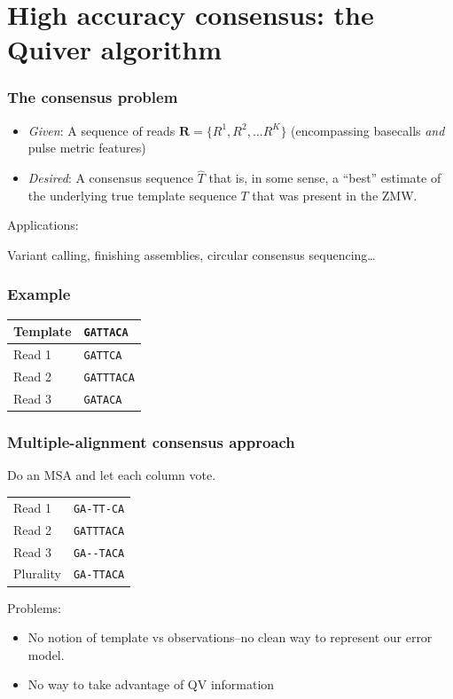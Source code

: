 \documentclass[serif,11pt]{beamer}
\begin{document}
\section{High accuracy consensus: the Quiver algorithm}
\label{sec-6}
\begin{frame}

  \sectionpage
\end{frame}
\begin{frame}
\frametitle{The consensus problem}
\label{sec-6-1}

\begin{itemize}
\item \emph{Given}: A sequence of reads $\mathbf{R} = \{R^1, R^2, \ldots
    R^{K}\}$ (encompassing basecalls \emph{and} pulse metric features)
\item \emph{Desired}: A consensus sequence $\widehat{T}$ that is, in some sense,
    a ``best'' estimate of the underlying true template sequence $T$ that
    was present in the ZMW.
\end{itemize}
\begin{block}{Applications:}
\label{sec-6-1-1}

    Variant calling, finishing assemblies, circular
    consensus sequencing\ldots{}
\end{block}
\end{frame}
\begin{frame}[fragile]
\frametitle{Example}
\label{sec-6-2}



\begin{center}
\begin{tabular}{ll}
 Template  &  \verb~GATTACA~   \\
\hline
 Read 1    &  \verb~GATTCA~    \\
 Read 2    &  \verb~GATTTACA~  \\
 Read 3    &  \verb~GATACA~    \\
\end{tabular}
\end{center}
\end{frame}
\begin{frame}[fragile]
\frametitle{Multiple-alignment consensus approach}
\label{sec-6-3}

   Do an MSA and let each column vote.


\begin{center}
\begin{tabular}{ll}
 Read 1     &  \verb$GA-TT-CA$  \\
 Read 2     &  \verb$GATTTACA$  \\
 Read 3     &  \verb$GA--TACA$  \\
\hline
 Plurality  &  \verb$GA-TTACA$  \\
\end{tabular}
\end{center}



   Problems:
\begin{itemize}
\item No notion of template vs observations--no clean way to represent our error model.
\item No way to take advantage of QV information
\end{itemize}
\end{frame}
\end{document}
